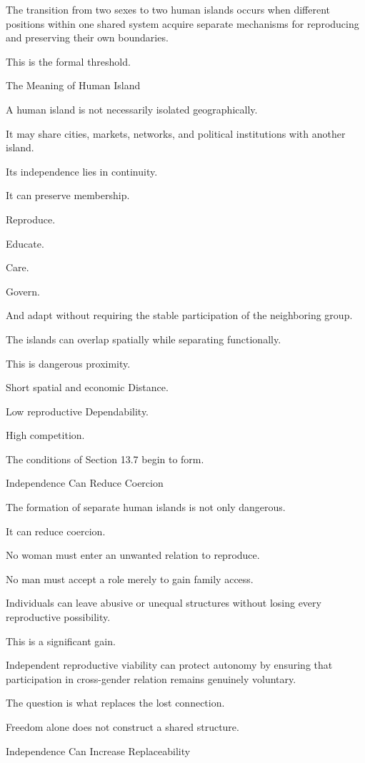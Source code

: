 The transition from two sexes to two human islands occurs when different positions within one shared system acquire separate mechanisms for reproducing and preserving their own boundaries.

This is the formal threshold.

The Meaning of Human Island

A human island is not necessarily isolated geographically.

It may share cities, markets, networks, and political institutions with another island.

Its independence lies in continuity.

It can preserve membership.

Reproduce.

Educate.

Care.

Govern.

And adapt without requiring the stable participation of the neighboring group.

The islands can overlap spatially while separating functionally.

This is dangerous proximity.

Short spatial and economic Distance.

Low reproductive Dependability.

High competition.

The conditions of Section 13.7 begin to form.

Independence Can Reduce Coercion

The formation of separate human islands is not only dangerous.

It can reduce coercion.

No woman must enter an unwanted relation to reproduce.

No man must accept a role merely to gain family access.

Individuals can leave abusive or unequal structures without losing every reproductive possibility.

This is a significant gain.

Independent reproductive viability can protect autonomy by ensuring that participation in cross-gender relation remains genuinely voluntary.

The question is what replaces the lost connection.

Freedom alone does not construct a shared structure.

Independence Can Increase Replaceability

